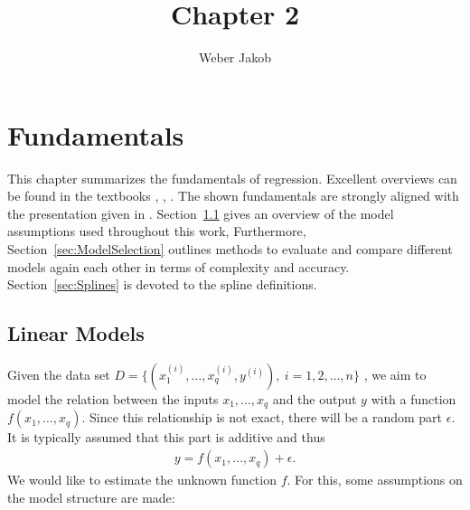 \documentclass[10pt,a4paper]{report}
\title{Chapter 2}
\author{Weber Jakob}
\begin{document}
\maketitle
\tableofcontents
\chapter{Fundamentals} \label{chap:fundamentals}

This chapter summarizes the fundamentals of regression. Excellent overviews can be found in the textbooks \cite{wood2017generalized}, \cite{fahrmeir2007regression}, \cite{friedman2001elements}. The shown fundamentals are strongly aligned with the presentation given in \cite{fahrmeir2007regression}. Section~\ref{sec:LinModel} gives an overview of the model assumptions used throughout this work, Furthermore, Section~\ref{sec:ModelSelection} outlines methods to evaluate and compare different models again each other in terms of complexity and accuracy. Section~\ref{sec:Splines} is devoted to the  spline definitions.

\section{Linear Models} \label{sec:LinModel}

Given the data set $D = \{ (x^{(i)}_1, \dots, x^{(i)}_q, y^{(i)}), \ i=1, 2, \dots, n\}$ , we aim to model the relation between the inputs $x_1, \dots, x_q$ and the output $y$ with a function $f(x_1, \dots, x_q)$. Since this relationship is not exact, there will be a random part $\epsilon$. It is typically assumed that this part is additive and thus  
\begin{align} \label{eq:model-structure}
	y = f(x_{1}, \dots, x_{q}) + \epsilon.
\end{align}
%
We would like to estimate the unknown function $f$. For this, some assumptions on the model structure are made:
\end{document}
